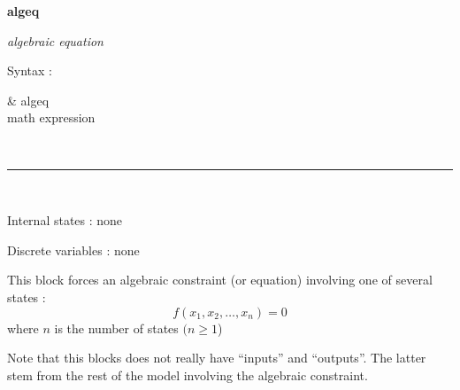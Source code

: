 \hypertarget{link_to_algeq}{}{\Large \bf algeq}

{\it algebraic equation

}

Syntax : \hspace*{10ex}\parbox[t]{\textwidth}{\sf 
\& algeq \\
math expression
}

~ \hrule ~

Internal states : none

Discrete variables : none

This block forces an algebraic constraint (or equation) involving one of several states :
\[ f(x_1, x_2, \ldots, x_n) = 0 \]
where $n$ is the number of states $(n \ge 1$)

Note that this blocks does not really have ``inputs'' and ``outputs''. The latter stem from the rest of the model involving the algebraic constraint.